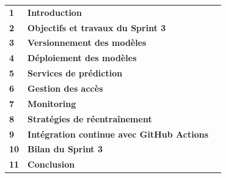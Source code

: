 \begin{center}

\renewcommand{\arraystretch}{1.35}

\begin{tabular}{p{0.8cm}p{10.7cm}r}

\textbf{1}
&
\textbf{Introduction}
&
\pageref{sec:ch5-introduction}
\\[0.22cm]

\textbf{2}
&
\textbf{Objectifs et travaux du Sprint 3}
&
\pageref{sec:sprint3-objectifs}
\\[0.22cm]

\textbf{3}
&
\textbf{Versionnement des modèles}
&
\pageref{sec:sprint3-versioning}
\\[0.22cm]

\textbf{4}
&
\textbf{Déploiement des modèles}
&
\pageref{sec:sprint3-deployment}
\\[0.22cm]

\textbf{5}
&
\textbf{Services de prédiction}
&
\pageref{sec:sprint3-prediction}
\\[0.22cm]

\textbf{6}
&
\textbf{Gestion des accès}
&
\pageref{sec:sprint3-access}
\\[0.22cm]

\textbf{7}
&
\textbf{Monitoring}
&
\pageref{sec:sprint3-monitoring}
\\[0.22cm]

\textbf{8}
&
\textbf{Stratégies de réentraînement}
&
\pageref{sec:sprint3-retraining}
\\[0.22cm]

\textbf{9}
&
\textbf{Intégration continue avec GitHub Actions}
&
\pageref{sec:sprint3-cicd}
\\[0.22cm]

\textbf{10}
&
\textbf{Bilan du Sprint 3}
&
\pageref{sec:sprint3-bilan}
\\[0.22cm]

\textbf{11}
&
\textbf{Conclusion}
&
\pageref{sec:ch5-conclusion}
\\[0.22cm]

\end{tabular}

\renewcommand{\arraystretch}{1}

\end{center}

\clearpage



